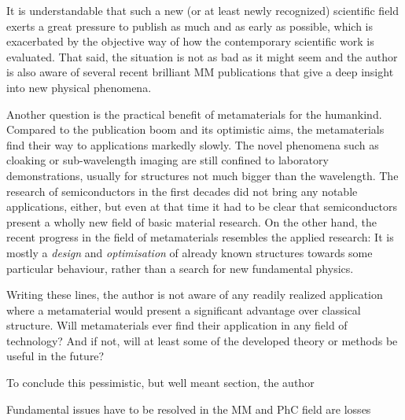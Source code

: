{%

It is understandable that such a new (or at least newly recognized) scientific field exerts a great pressure to publish as much and as early as possible, which is exacerbated by the objective way of how the contemporary scientific work is evaluated. 
That said, the situation is not as bad as it might seem and the author is also aware of several recent brilliant MM publications that give a deep insight into new physical phenomena.


Another question is the practical benefit of metamaterials for the humankind. 
Compared to the publication boom and its optimistic aims, the metamaterials find their way to applications markedly slowly. The novel phenomena such as cloaking or sub-wavelength imaging are still confined to laboratory demonstrations, usually for structures not much bigger than the wavelength. The research of semiconductors in the first decades did not bring any notable applications, either, but even at that time it had to be clear that semiconductors present a wholly new field of basic material research. On the other hand, the recent progress in the field of metamaterials resembles the applied research: It is mostly a \textit{design} and \textit{optimisation} of already known structures towards some particular behaviour, rather than a search for new fundamental physics. 

Writing these lines, the author is not aware of any readily realized application where a metamaterial would present a significant advantage over classical structure. Will metamaterials ever find their application in any field of technology? And if not, will at least some of the developed theory or methods be useful in the future?

To conclude this pessimistic, but well meant section, the author
}


Fundamental issues have to be resolved in the MM and PhC field are
losses

